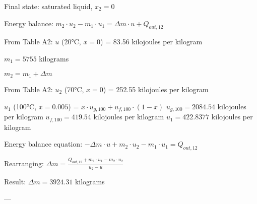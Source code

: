 Final state: saturated liquid, \( x_2 = 0 \)  

Energy balance:  
\( m_2 \cdot u_2 - m_1 \cdot u_1 = \Delta m \cdot u + Q_{out,12} \)  

From Table A2:  
\( u \) (20°C, \( x = 0 \)) = 83.56 kilojoules per kilogram  

\( m_1 = 5755 \) kilograms  

\( m_2 = m_1 + \Delta m \)  

From Table A2:  
\( u_2 \) (70°C, \( x = 0 \)) = 252.55 kilojoules per kilogram  

\( u_1 \) (100°C, \( x = 0.005 \)) = \( x \cdot u_{g,100} + u_{f,100} \cdot (1 - x) \)  
\( u_{g,100} = 2084.54 \) kilojoules per kilogram  
\( u_{f,100} = 419.54 \) kilojoules per kilogram  
\( u_1 = 422.8377 \) kilojoules per kilogram  

Energy balance equation:  
\( -\Delta m \cdot u + m_2 \cdot u_2 - m_1 \cdot u_1 = Q_{out,12} \)  

Rearranging:  
\( \Delta m = \frac{Q_{out,12} + m_1 \cdot u_1 - m_2 \cdot u_2}{u_2 - u} \)  

Result:  
\( \Delta m = 3924.31 \) kilograms  

---